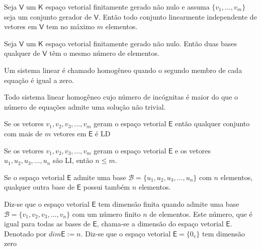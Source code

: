 \documentclass[10pt,a4paper]{article}
\begin{document}
\begin{proposition}
	Seja $\mathsf{V}$ um $\mathsf{K}$ espaço vetorial finitamente gerado não nulo e assuma $\{v_1, \dots, v_m\}$ seja um conjunto gerador de $\mathsf{V}$. Então todo conjunto linearmente independente de vetores em $\mathsf{V}$ tem no máximo $m$ elementos.
\end{proposition}

\begin{corollary}
	Seja $\mathsf{V}$ um $\mathsf{K}$ espaço vetorial finitamente gerado não nulo. Então duas bases qualquer de $\mathsf{V}$ têm o mesmo número de elementos.
\end{corollary}

\begin{definition}
	Um sistema linear é chamado homogêneo quando o segundo membro de cada equação é igual a zero.
\end{definition}

\begin{theorem}
	Todo sistema linear homogêneo cujo número de incógnitas é maior do que o número de equações admite uma solução não trivial.
\end{theorem}

\begin{theorem}
	Se os vetores $v_1, v_2, v_3, \dots, v_m$ geram o espaço vetorial $\textsf{E}$ então qualquer conjunto com mais de $m$ vetores em $\textsf{E}$ é LD
\end{theorem}

\begin{theorem}
	Se os vetores $v_1, v_2, v_3, \dots, v_m$ geram o espaço vetorial $\textsf{E}$ e os vetores $u_1, u_2, u_3, \dots, u_n$ são LI, então $n \leq m$.
\end{theorem}

\begin{theorem}
	Se o espaço vetorial $\textsf{E}$ admite uma base $\mathcal{B} = \{ u_1, u_2, u_3, \dots, u_n \}$ com $n$ elementos, qualquer outra base de $\textsf{E}$ possui também $n$ elementos.
\end{theorem}

\begin{definition}
	Diz-se que o espaço vetorial $\textsf{E}$ tem dimensão finita quando admite uma base $\mathcal{B} = \{ v_1, v_2, v_3, \dots, v_n \}$ com um número finito $n$ de elementos. Este número, que é igual para todas as bases de $\textsf{E}$, chama-se a dimensão do espaço vetorial $\textsf{E}$. Denotado por $dim \textsf{E} := n$. Diz-se que o espaço vetorial $\textsf{E} = \{ 0_v \}$ tem dimensão zero
\end{definition}
\end{document}
